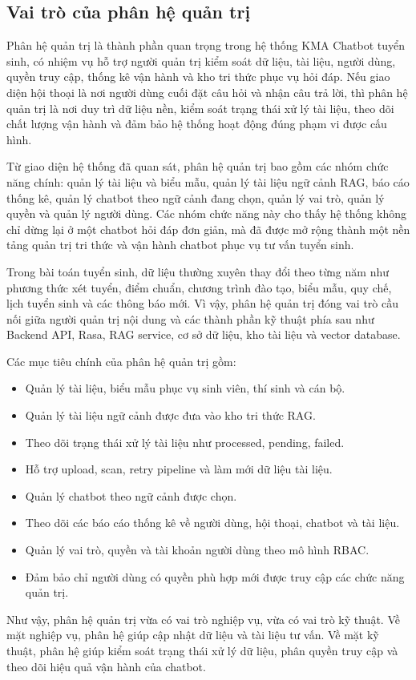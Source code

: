 \subsection{Vai trò của phân hệ quản trị}

Phân hệ quản trị là thành phần quan trọng trong hệ thống KMA Chatbot tuyển sinh, có nhiệm vụ hỗ trợ người quản trị kiểm soát dữ liệu, tài liệu, người dùng, quyền truy cập, thống kê vận hành và kho tri thức phục vụ hỏi đáp. Nếu giao diện hội thoại là nơi người dùng cuối đặt câu hỏi và nhận câu trả lời, thì phân hệ quản trị là nơi duy trì dữ liệu nền, kiểm soát trạng thái xử lý tài liệu, theo dõi chất lượng vận hành và đảm bảo hệ thống hoạt động đúng phạm vi được cấu hình.

Từ giao diện hệ thống đã quan sát, phân hệ quản trị bao gồm các nhóm chức năng chính: quản lý tài liệu và biểu mẫu, quản lý tài liệu ngữ cảnh RAG, báo cáo thống kê, quản lý chatbot theo ngữ cảnh đang chọn, quản lý vai trò, quản lý quyền và quản lý người dùng. Các nhóm chức năng này cho thấy hệ thống không chỉ dừng lại ở một chatbot hỏi đáp đơn giản, mà đã được mở rộng thành một nền tảng quản trị tri thức và vận hành chatbot phục vụ tư vấn tuyển sinh.

Trong bài toán tuyển sinh, dữ liệu thường xuyên thay đổi theo từng năm như phương thức xét tuyển, điểm chuẩn, chương trình đào tạo, biểu mẫu, quy chế, lịch tuyển sinh và các thông báo mới. Vì vậy, phân hệ quản trị đóng vai trò cầu nối giữa người quản trị nội dung và các thành phần kỹ thuật phía sau như Backend API, Rasa, RAG service, cơ sở dữ liệu, kho tài liệu và vector database.

Các mục tiêu chính của phân hệ quản trị gồm:

\begin{itemize}
    \item Quản lý tài liệu, biểu mẫu phục vụ sinh viên, thí sinh và cán bộ.
    \item Quản lý tài liệu ngữ cảnh được đưa vào kho tri thức RAG.
    \item Theo dõi trạng thái xử lý tài liệu như processed, pending, failed.
    \item Hỗ trợ upload, scan, retry pipeline và làm mới dữ liệu tài liệu.
    \item Quản lý chatbot theo ngữ cảnh được chọn.
    \item Theo dõi các báo cáo thống kê về người dùng, hội thoại, chatbot và tài liệu.
    \item Quản lý vai trò, quyền và tài khoản người dùng theo mô hình RBAC.
    \item Đảm bảo chỉ người dùng có quyền phù hợp mới được truy cập các chức năng quản trị.
\end{itemize}

Như vậy, phân hệ quản trị vừa có vai trò nghiệp vụ, vừa có vai trò kỹ thuật. Về mặt nghiệp vụ, phân hệ giúp cập nhật dữ liệu và tài liệu tư vấn. Về mặt kỹ thuật, phân hệ giúp kiểm soát trạng thái xử lý dữ liệu, phân quyền truy cập và theo dõi hiệu quả vận hành của chatbot.
